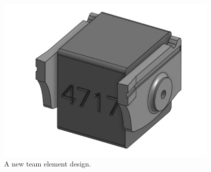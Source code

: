 \begin{figure}[htp]
\centering
\includegraphics[width=0.95\textwidth, angle=0]{Meetings/April/04-14-22/04-14-22 2.png}
\caption{A new team element design.}
\label{fig:041422_2}
\end{figure}


